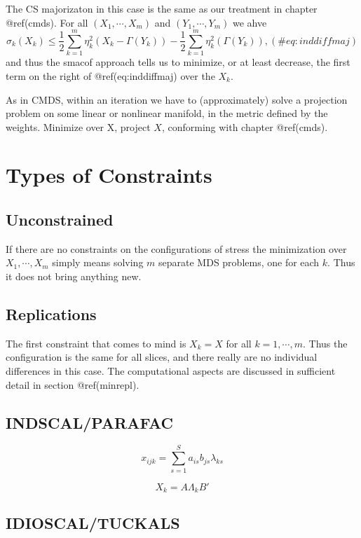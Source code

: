 \documentclass[
  12pt,
  letterpaper,
  DIV=11,
  numbers=noendperiod]{scrreprt}
\theoremstyle{remark}
\begin{document}
The CS majorizaton in this case is the same as our treatment in chapter
@ref(cmds). For all \((X_1,\cdots,X_m)\) and \((Y_1,\cdots,Y_m)\) we
ahve \begin{equation}
\sigma_k(X_k)\leq\frac12\sum_{k=1}^m\eta_k^2(X_k-\Gamma(Y_k))-\frac12\sum_{k=1}^m\eta^2_k(\Gamma(Y_k)),
(\#eq:inddiffmaj)
\end{equation} and thus the smacof approach tells us to minimize, or at
least decrease, the first term on the right of @ref(eq:inddiffmaj) over
the \(X_k\).

As in CMDS, within an iteration we have to (approximately) solve a
projection problem on some linear or nonlinear manifold, in the metric
defined by the weights. Minimize over X, project \(X\), conforming with
chapter @ref(cmds).

\section{Types of Constraints}\label{types-of-constraints}

\subsection{Unconstrained}\label{indifunc}

If there are no constraints on the configurations of stress the
minimization over \(X_1,\cdots,X_m\) simply means solving \(m\) separate
MDS problems, one for each \(k\). Thus it does not bring anything new.

\subsection{Replications}\label{indifrepl}

The first constraint that comes to mind is \(X_k=X\) for all
\(k=1,\cdots,m\). Thus the configuration is the same for all slices, and
there really are no individual differences in this case. The
computational aspects are discussed in sufficient detail in section
@ref(minrepl).

\subsection{INDSCAL/PARAFAC}\label{indifindscal}

\[
x_{ijk}=\sum_{s=1}^Sa_{is}b_{js}\lambda_{ks}
\]

\[X_k=A\Lambda_kB'\]

\subsection{IDIOSCAL/TUCKALS}\label{indifidioscal}
\end{document}
